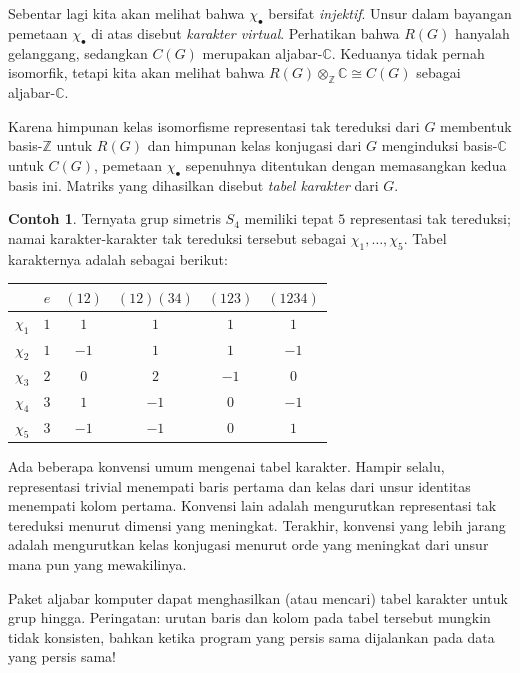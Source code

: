 \documentclass[12pt]{article}
\theoremstyle{plain}
\theoremstyle{definition}
\newtheorem{example}[theorem]{Contoh}
\theoremstyle{remark}
\numberwithin{equation}{section}
\begin{document}
Sebentar lagi kita akan melihat bahwa $\chi_{\bullet}$ bersifat \emph{injektif}.
Unsur dalam bayangan pemetaan $\chi_{\bullet}$ di atas disebut \emph{karakter
virtual}. Perhatikan bahwa $R(G)$ hanyalah gelanggang, sedangkan $C(G)$ merupakan
aljabar-$\mathbb{C}$. Keduanya tidak pernah isomorfik, tetapi kita akan melihat bahwa
$R(G) \otimes_\mathbb{Z} \mathbb{C} \cong C(G)$ sebagai aljabar-$\mathbb{C}$.

Karena himpunan kelas isomorfisme representasi tak tereduksi dari
$G$ membentuk basis-$\mathbb{Z}$ untuk $R(G)$
dan himpunan kelas konjugasi dari $G$
menginduksi basis-$\mathbb{C}$ untuk $C(G)$,
pemetaan $\chi_{\bullet}$ sepenuhnya ditentukan dengan memasangkan kedua basis ini.
Matriks yang dihasilkan disebut \emph{tabel karakter} dari $G$.

\begin{example}
Ternyata grup simetris $S_4$ memiliki tepat $5$ representasi
tak tereduksi; namai karakter-karakter tak tereduksi tersebut
sebagai $\chi_1, \ldots, \chi_5$.
Tabel karakternya adalah sebagai berikut:
\begin{center}
\begin{tabular}{|c|c|c|c|c|c|}
\hline 
 & $e $ & $(12)$ & $(12)(34)$ & $(123)$ & $(1234)$\\
\hline 
\hline 
$\chi_1$ & $1$ & $1$ & $1$ & $1$ & $1$\\
\hline 
$\chi_2$ & $1$ & $-1$ & $1$ & $1$ & $-1$\\
\hline 
$\chi_3$ & $2$ & $0$ & $2$ & $-1$ & $0$\\
\hline 
$\chi_4$ & $3$ & $1$ & $-1$ & $0$ & $-1$\\
\hline 
$\chi_5$ & $3$ & $-1$ & $-1$ & $0$ & $1$\\
\hline 
\end{tabular}
\end{center}
\end{example}

Ada beberapa konvensi umum mengenai tabel karakter.
Hampir selalu,
representasi trivial menempati baris pertama dan kelas dari
unsur identitas menempati kolom pertama.
Konvensi lain adalah mengurutkan representasi tak tereduksi menurut
dimensi yang meningkat.
Terakhir, konvensi yang lebih jarang adalah mengurutkan kelas konjugasi menurut
orde yang meningkat dari unsur mana pun yang mewakilinya.

Paket aljabar komputer dapat menghasilkan (atau mencari) tabel karakter
untuk grup hingga. Peringatan: urutan baris dan kolom pada
tabel tersebut mungkin tidak konsisten, bahkan ketika program yang persis sama dijalankan pada
data yang persis sama!
\end{document}
